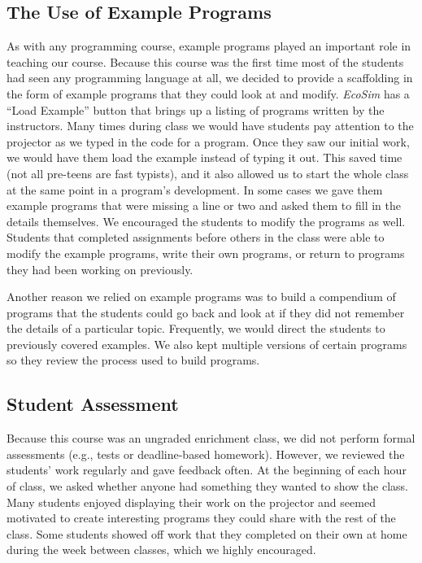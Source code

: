 \documentclass{sig-alternate}
\begin{document}
\subsection{The Use of Example Programs}
As with any programming course, example programs played an important role in teaching our course.
Because this course was the first time most of the students had seen any programming language at all, we decided to provide a scaffolding in the form of example programs that they could look at and modify.  
\emph{EcoSim} has a ``Load Example'' button that brings up a listing of programs written by the instructors.  
Many times during class we would have students pay attention to the projector as we typed in the code for a program.
Once they saw our initial work, we would have them load the example instead of typing it out.  
This saved time (not all pre-teens are fast typists), and it also allowed us to start the whole class at the same point in a program's development.  
In some cases we gave them example programs that were missing a line or two and asked them to fill in the details themselves.  
We encouraged the students to modify the programs as well.
Students that completed assignments before others in the class were able to modify the example programs, write their own programs, or return to programs they had been working on previously.

Another reason we relied on example programs was to build a compendium of programs that the students
could go back and look at if they did not remember the details of a particular topic.  Frequently,
we would direct the students to previously covered examples.
We also kept multiple versions of certain programs so they review the process used to build programs.

\subsection{Student Assessment}
Because this course was an ungraded enrichment class, we did not perform formal assessments (e.g., tests or deadline-based homework). 
However, we reviewed the students' work regularly and gave feedback often.  
At the beginning of each hour of class, we asked whether anyone had something they wanted to show the class.  
Many students enjoyed displaying their work on the projector and seemed motivated to create interesting programs they could share with the rest of the class.  
Some students showed off work that they completed on their own at home during the week between classes, which we highly encouraged.
\end{document}
